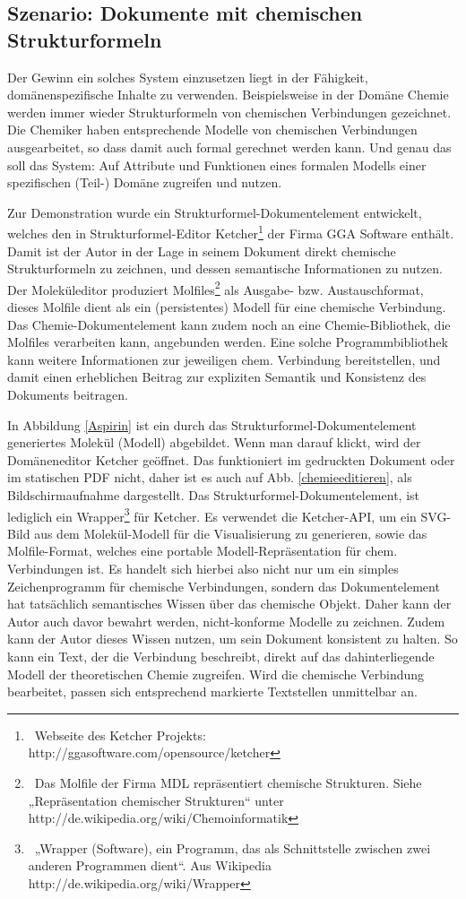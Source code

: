  
\subsection{Szenario: Dokumente mit chemischen Strukturformeln}\label{chemie-szenario}
 
Der Gewinn ein solches System einzusetzen liegt in der Fähigkeit, domänenspezifische Inhalte zu verwenden. Beispielsweise in der Domäne Chemie werden immer wieder Strukturformeln von chemischen Verbindungen gezeichnet. Die Chemiker haben entsprechende Modelle von chemischen Verbindungen ausgearbeitet, so dass damit auch formal gerechnet werden kann. Und genau das soll das System: Auf Attribute und Funktionen eines formalen Modells einer spezifischen (Teil-) Domäne zugreifen und nutzen.

 
Zur Demonstration wurde ein Strukturformel-Dokumentelement entwickelt, welches den in Strukturformel-Editor Ketcher\footnote{~Webseite des Ketcher Projekts: http://ggasoftware.com/opensource/ketcher} der Firma GGA Software enthält. Damit ist der Autor in der Lage in seinem Dokument direkt chemische Strukturformeln zu zeichnen, und dessen semantische Informationen zu nutzen. Der Moleküleditor produziert Molfiles\footnote{~Das Molfile der Firma MDL repräsentiert chemische Strukturen. Siehe „Repräsentation chemischer Strukturen“ unter http://de.wikipedia.org/wiki/Chemoinformatik } als Ausgabe- bzw. Austauschformat, dieses Molfile dient als ein (persistentes) Modell für eine chemische Verbindung. Das Chemie-Dokumentelement kann zudem noch an eine Chemie-Bibliothek, die Molfiles verarbeiten kann, angebunden werden. Eine solche Programmbibliothek kann weitere Informationen zur jeweiligen chem. Verbindung bereitstellen, und damit einen erheblichen Beitrag zur expliziten Semantik und Konsistenz des Dokuments beitragen.

 
In Abbildung \ref{Aspirin} ist ein durch das Strukturformel-Dokumentelement generiertes Molekül (Modell) abgebildet. Wenn man darauf klickt, wird der Domäneneditor Ketcher geöffnet. Das funktioniert im gedruckten Dokument oder im statischen PDF nicht, daher ist es auch auf Abb. \ref{chemieeditieren}, als Bildschirmaufnahme dargestellt. Das Strukturformel-Dokumentelement, ist lediglich ein Wrapper\footnote{~„Wrapper (Software), ein Programm, das als Schnittstelle zwischen zwei anderen Programmen dient“. Aus Wikipedia http://de.wikipedia.org/wiki/Wrapper} für Ketcher. Es verwendet die Ketcher-API, um ein SVG-Bild aus dem Molekül-Modell für die Visualisierung zu generieren, sowie das Molfile-Format, welches eine portable Modell-Repräsentation für chem. Verbindungen ist. Es handelt sich hierbei also nicht nur um ein simples Zeichenprogramm für chemische Verbindungen, sondern das Dokumentelement hat tatsächlich semantisches Wissen über das chemische Objekt. Daher kann der Autor auch davor bewahrt werden, nicht-konforme Modelle zu zeichnen. Zudem kann der Autor dieses Wissen nutzen, um sein Dokument konsistent zu halten. So kann ein Text, der die Verbindung beschreibt, direkt auf das dahinterliegende Modell der theoretischen Chemie zugreifen. Wird die chemische Verbindung bearbeitet, passen sich entsprechend markierte Textstellen unmittelbar an.

